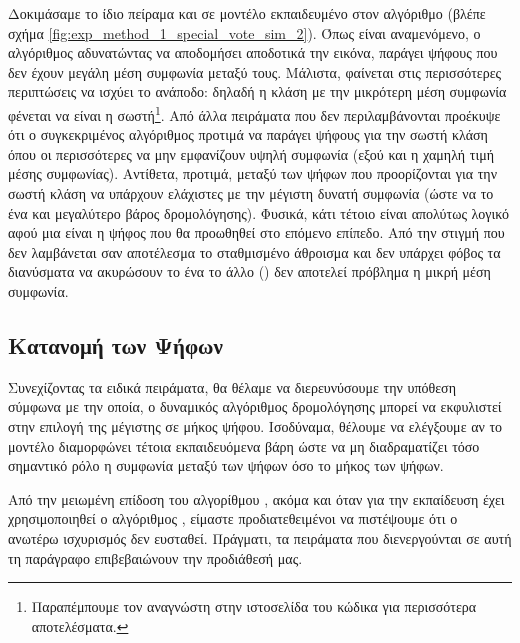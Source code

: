 Δοκιμάσαμε το ίδιο πείραμα και σε μοντέλο εκπαιδευμένο στον αλγόριθμο  (βλέπε σχήμα \ref{fig:exp_method_1_special_vote_sim_2}). Όπως είναι αναμενόμενο, ο αλγόριθμος αδυνατώντας να αποδομήσει αποδοτικά την εικόνα, παράγει ψήφους που δεν έχουν μεγάλη μέση συμφωνία μεταξύ τους. Μάλιστα, φαίνεται στις περισσότερες περιπτώσεις να ισχύει το ανάποδο: δηλαδή η κλάση με την μικρότερη μέση συμφωνία φένεται να είναι η σωστή\footnote{Παραπέμπουμε τον αναγνώστη στην ιστοσελίδα του κώδικα για περισσότερα αποτελέσματα.}. Από άλλα πειράματα που δεν περιλαμβάνονται προέκυψε ότι ο συγκεκριμένος αλγόριθμος προτιμά να παράγει ψήφους για την σωστή κλάση όπου οι περισσότερες να μην εμφανίζουν υψηλή συμφωνία (εξού και η χαμηλή τιμή μέσης συμφωνίας). Αντίθετα, προτιμά, μεταξύ των ψήφων που προορίζονται για την σωστή κλάση να υπάρχουν ελάχιστες με την μέγιστη δυνατή συμφωνία (ώστε να  το ένα και μεγαλύτερο βάρος δρομολόγησης). Φυσικά, κάτι τέτοιο είναι απολύτως λογικό αφού μια είναι η ψήφος που θα προωθηθεί στο επόμενο επίπεδο. Από την στιγμή που δεν λαμβάνεται σαν αποτέλεσμα το σταθμισμένο άθροισμα και δεν υπάρχει φόβος τα διανύσματα να ακυρώσουν το ένα το άλλο () δεν αποτελεί πρόβλημα η μικρή μέση συμφωνία.\par

\subsection{Κατανομή των Ψήφων}
Συνεχίζοντας τα ειδικά πειράματα, θα θέλαμε να διερευνύσουμε την υπόθεση σύμφωνα με την οποία, ο δυναμικός αλγόριθμος δρομολόγησης μπορεί να εκφυλιστεί στην επιλογή της μέγιστης σε μήκος ψήφου. Ισοδύναμα, θέλουμε να ελέγξουμε αν το μοντέλο διαμορφώνει τέτοια εκπαιδευόμενα βάρη ώστε να μη διαδραματίζει τόσο σημαντικό ρόλο η συμφωνία μεταξύ των ψήφων όσο το μήκος των ψήφων.\par

Από την μειωμένη επίδοση του αλγορίθμου , ακόμα και όταν για την εκπαίδευση έχει χρησιμοποιηθεί ο αλγόριθμος , είμαστε προδιατεθειμένοι να πιστέψουμε ότι ο ανωτέρω ισχυρισμός δεν ευσταθεί. Πράγματι, τα πειράματα που διενεργούνται σε αυτή τη παράγραφο επιβεβαιώνουν την προδιάθεσή μας.\par
    
